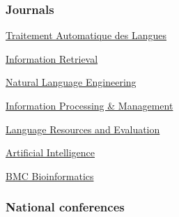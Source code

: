\subsubsection*{Journals}

\begin{itemize*}[label={},
                 itemjoin={{,\space}},
                 afterlabel={},
                 after={{.}}]
    
    \item \href{http://www.atala.org/-Revue-TAL-}{Traitement Automatique des Langues}
    \item \href{http://link.springer.com/journal/10791}{Information Retrieval}
    \item \href{https://www.cambridge.org/core/journals/natural-language-engineering}{Natural Language Engineering}
    \item \href{http://www.journals.elsevier.com/information-processing-and-management}{Information Processing \& Management}
    \item \href{http://link.springer.com/journal/10579}{Language Resources and Evaluation}
    \item \href{https://aij.ijcai.org/}{Artificial Intelligence}
    \item \href{https://bmcbioinformatics.biomedcentral.com/}{BMC Bioinformatics}

\end{itemize*}

\subsubsection*{National conferences}

